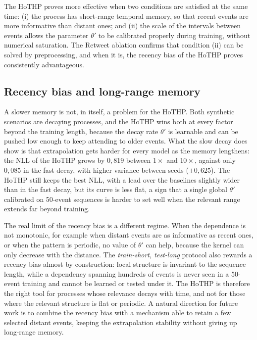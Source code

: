 The HoTHP proves more effective when two conditions are satisfied at the same time: (i) the process has short-range temporal memory, so that recent events are more informative than distant ones; and (ii) the scale of the intervals between events allows the parameter $\theta'$ to be calibrated properly during training, without numerical saturation. The Retweet ablation confirms that condition (ii) can be solved by preprocessing, and when it is, the recency bias of the HoTHP proves consistently advantageous.

\subsection{Recency bias and long-range memory}
\label{subsec:memoria-longo-alcance}

A slower memory is not, in itself, a problem for the HoTHP. Both synthetic scenarios are decaying processes, and the HoTHP wins both at every factor beyond the training length, because the decay rate $\theta'$ is learnable and can be pushed low enough to keep attending to older events. What the slow decay does show is that extrapolation gets harder for every model as the memory lengthens: the NLL of the HoTHP grows by $0{,}819$ between $1\times$ and $10\times$, against only $0{,}085$ in the fast decay, with higher variance between seeds ($\pm 0{,}625$). The HoTHP still keeps the best NLL, with a lead over the baselines slightly wider than in the fast decay, but its curve is less flat, a sign that a single global $\theta'$ calibrated on 50-event sequences is harder to set well when the relevant range extends far beyond training.

The real limit of the recency bias is a different regime. When the dependence is not monotonic, for example when distant events are as informative as recent ones, or when the pattern is periodic, no value of $\theta'$ can help, because the kernel can only decrease with the distance. The \textit{train-short, test-long} protocol also rewards a recency bias almost by construction: local structure is invariant to the sequence length, while a dependency spanning hundreds of events is never seen in a 50-event training and cannot be learned or tested under it. The HoTHP is therefore the right tool for processes whose relevance decays with time, and not for those where the relevant structure is flat or periodic. A natural direction for future work is to combine the recency bias with a mechanism able to retain a few selected distant events, keeping the extrapolation stability without giving up long-range memory.

